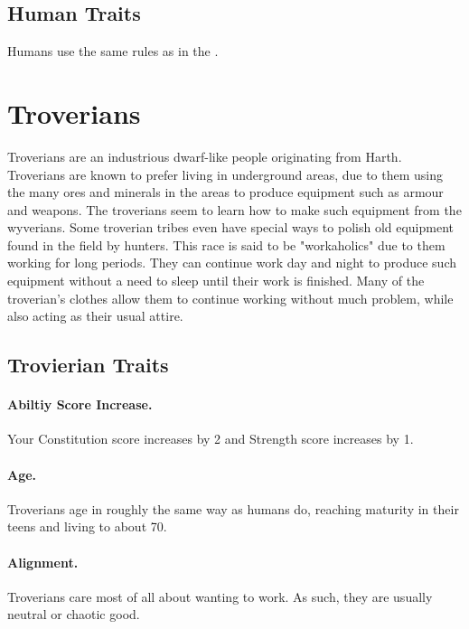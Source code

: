 \subsection*{Human Traits}
Humans use the same rules as in the \PHB.


\section{Troverians}


Troverians are an industrious dwarf-like people originating from Harth. Troverians are known to prefer living in underground areas, due to them using the many ores and minerals in the areas to produce equipment such as armour and weapons. The troverians seem to learn how to make such equipment from the wyverians. Some troverian tribes even have special ways to polish old equipment found in the field by hunters. This race is said to be "workaholics" due to them working for long periods. They can continue work day and night to produce such equipment without a need to sleep until their work is finished. Many of the troverian's clothes allow them to continue working without much problem, while also acting as their usual attire.

\subsection*{Trovierian Traits}
\paragraph{Abiltiy Score Increase.} Your Constitution score increases by 2 and Strength score increases by 1.

\paragraph{Age.} Troverians age in roughly the same way as humans do, reaching maturity in their teens and living to about 70.

\paragraph{Alignment.} Troverians care most of all about wanting to work. As such, they are usually neutral or chaotic good.

